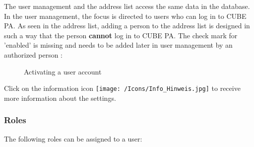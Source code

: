 The user management and the address list access the same data in the database. In the user management, the focus is directed to users who can log in to CUBE PA. As seen in the address list, adding a person to the address list is designed in such a way that the person \textbf{cannot} log in to CUBE PA. The check mark for 'enabled' is missing and needs to be added later in user management by an authorized person :

\begin{figure}[H]
\caption{Activating a user account}
\end{figure}

Click on the information icon \texttt{[image: /Icons/Info\_Hinweis.jpg]} to receive more information about the settings.

\vspace{-10pt}

\subsubsection{Roles}
\label{bkm:Ref445361985}

The following roles can be assigned to a user:

